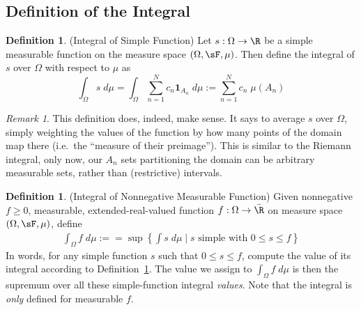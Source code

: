 \documentclass[12pt]{article}
\theoremstyle{plain}
\theoremstyle{definition}
\newtheorem{defn}[thm]{Definition}
\theoremstyle{remark}
\newtheorem*{rmk}{Remark}
\newcommand{\ra}{\rightarrow}
\newcommand{\one}[1]{\mathbf{1}_{#1}}
\newcommand{\sumnN}{\sum^N_{n=1}}
\begin{document}
\clearpage
\subsection{Definition of the Integral}

\begin{defn}(Integral of Simple Function)
\label{simpleint}
Let $s:\Omega\ra\R$ be a simple measurable function on the measure space
$(\Omega,\sF,\mu)$. Then define the integral of $s$ over $\Omega$ with
respect to $\mu$ as
\begin{equation}
    \int_\Omega s \; d\mu
    =
    \int_\Omega \sumnN c_n \one{A_n} \; d\mu
    := \sumnN c_n \; \mu(A_n)
\end{equation}
\end{defn}
\begin{rmk}
This definition does, indeed, make sense.
It says to average $s$ over $\Omega$, simply weighting the values of the
function by how many points of the domain map there (i.e.\ the ``measure
of their preimage''). This is similar to the Riemann integral, only now,
our $A_n$ sets partitioning the domain can be arbitrary measurable sets,
rather than (restrictive) intervals.
\end{rmk}

\begin{defn}(Integral of Nonnegative Measurable Function)
Given nonnegative $f\geq0$, measurable, extended-real-valued function
$f:\Omega\ra\bar{\R}$ on measure space $(\Omega,\sF,\mu)$, define
\begin{align*}
    \int_\Omega f \; d\mu :=
    = \sup \left\{
      \int s\; d\mu \;|\; \text{$s$ simple with $0\leq s\leq f$}
    \right\}
\end{align*}
In words, for any simple function $s$ such that $0\leq s\leq f$, compute
the value of its integral according to Definition~\ref{simpleint}.
The value we assign to $\int_\Omega f\;d\mu$ is then the supremum over
all these simple-function integral \emph{values}.
Note that the integral is \emph{only} defined for measurable $f$.
\end{defn}
\end{document}

